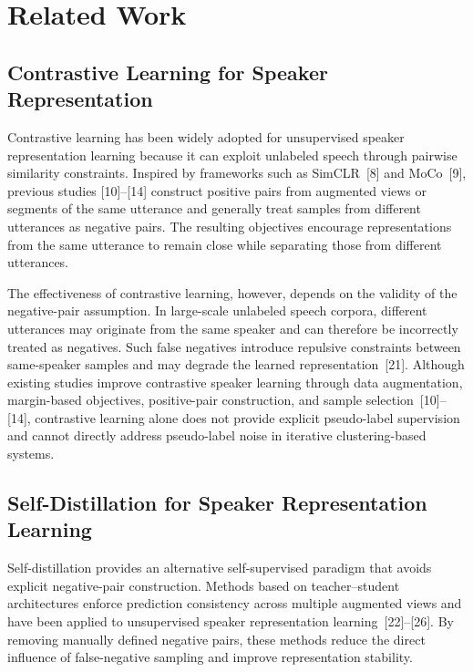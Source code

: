 \documentclass[journal]{IEEEtran}
\begin{document}
\section{Related Work}

\subsection{Contrastive Learning for Speaker Representation}

Contrastive learning has been widely adopted for unsupervised
speaker representation learning because it can exploit unlabeled
speech through pairwise similarity constraints. Inspired by
frameworks such as SimCLR~[8] and MoCo~[9], previous studies
[10]--[14] construct positive pairs from augmented views or segments
of the same utterance and generally treat samples from different
utterances as negative pairs. The resulting objectives encourage
representations from the same utterance to remain close while
separating those from different utterances.

The effectiveness of contrastive learning, however, depends on the
validity of the negative-pair assumption. In large-scale unlabeled
speech corpora, different utterances may originate from the same
speaker and can therefore be incorrectly treated as negatives. Such
false negatives introduce repulsive constraints between same-speaker
samples and may degrade the learned representation~[21]. Although
existing studies improve contrastive speaker learning through data
augmentation, margin-based objectives, positive-pair construction,
and sample selection~[10]--[14], contrastive learning alone does not
provide explicit pseudo-label supervision and cannot directly address
pseudo-label noise in iterative clustering-based systems.

\subsection{Self-Distillation for Speaker Representation Learning}

Self-distillation provides an alternative self-supervised paradigm
that avoids explicit negative-pair construction. Methods based on
teacher--student architectures enforce prediction consistency across
multiple augmented views and have been applied to unsupervised
speaker representation learning~[22]--[26]. By removing manually
defined negative pairs, these methods reduce the direct influence of
false-negative sampling and improve representation stability.
\end{document}
